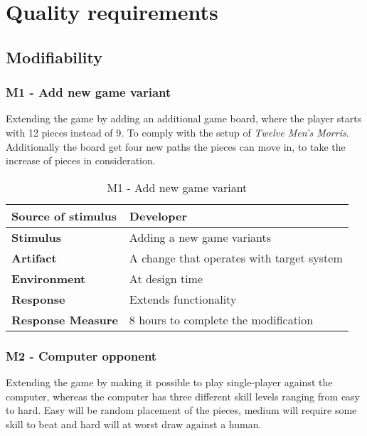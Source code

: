 \newpage

\section{Quality requirements}

\subsection{Modifiability}

\subsubsection{M1 - Add new game variant}

Extending the game by adding an additional game board, where the player starts with 12 pieces instead of 9. To comply  with the setup of \emph{Twelve Men's Morris}. Additionally the board get four new paths the pieces can move in, to take the increase of pieces in consideration.

\begin{table}[h!]
\begin{tabular}{ | p{110pt} | p{250pt}  |}
\hline
\bf Source of stimulus &  Developer  \\ \hline
\bf Stimulus & Adding a new game variants \\ \hline 
\bf Artifact & A change that operates with target system  \\  \hline
\bf Environment & At design time \\ \hline
\bf Response & Extends functionality \\ \hline
\bf Response Measure & 8 hours to complete the modification \\ \hline

\end{tabular}
\caption{M1 - Add new game variant}
\end{table}

\pagebreak

\subsubsection{M2 - Computer opponent}

Extending the game by making it possible to play single-player against the computer, whereas the computer has three different skill levels ranging from easy to hard. Easy will be random placement of the pieces, medium will require some skill to beat and hard will at worst draw against a human.

